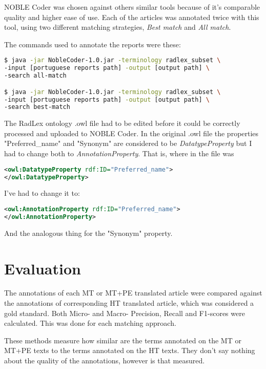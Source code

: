 NOBLE Coder was chosen against others similar tools because of it's comparable quality and higher ease of use. Each of the articles was annotated twice with this tool, using two different matching strategies, \textit{Best match} and \textit{All match}.

The commands used to annotate the reports were these:


\begin{lstlisting}[language=bash]
$ java -jar NobleCoder-1.0.jar -terminology radlex_subset \
-input [portuguese reports path] -output [output path] \
-search all-match

$ java -jar NobleCoder-1.0.jar -terminology radlex_subset \
-input [portuguese reports path] -output [output path] \
-search best-match
\end{lstlisting}


The RadLex ontology .owl file had to be edited before it could be correctly processed and uploaded to NOBLE Coder. In the original .owl file the properties  "Preferred\_name" and "Synonym" are considered to be \textit{DatatypeProperty} but I had to change both to \textit{AnnotationProperty}. That is, where in the file was


\begin{lstlisting}[language=xml]
<owl:DatatypeProperty rdf:ID="Preferred_name">
</owl:DatatypeProperty>
\end{lstlisting}


I've had to change it to:


\begin{lstlisting}[language=xml]
<owl:AnnotationProperty rdf:ID="Preferred_name">
</owl:AnnotationProperty>
\end{lstlisting}


And the analogous thing for the "Synonym" property.

\section{Evaluation}

The annotations of each MT or MT+PE translated article were compared against the annotations of corresponding HT translated article, which was considered a gold standard. Both Micro- and Macro- Precision, Recall and F1-scores were calculated. This was done for each matching approach. 

These methods measure how similar are the terms annotated on the MT or MT+PE texts to the terms annotated on the HT texts. They don't say nothing about the quality of the annotations, however is that measured. 





 